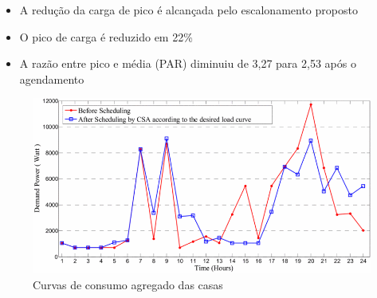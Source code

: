 \begin{frame}
  \begin{block}{}
    \begin{itemize}
      \item \small A redução da carga de pico é alcançada pelo escalonamento proposto
      \item \small \alert{O pico de carga é reduzido em 22\%}  
      \item \small A razão entre pico e média (PAR) diminuiu de 3,27 para 2,53 após o agendamento
    \end{itemize}
  \end{block}
  
  \begin{figure}[h]
  	\begin{center}
      \includegraphics [scale=0.32]{./Figures/result4}
      \caption {Curvas de consumo agregado das casas}
  	\end{center}
  \end{figure}
\end{frame}



